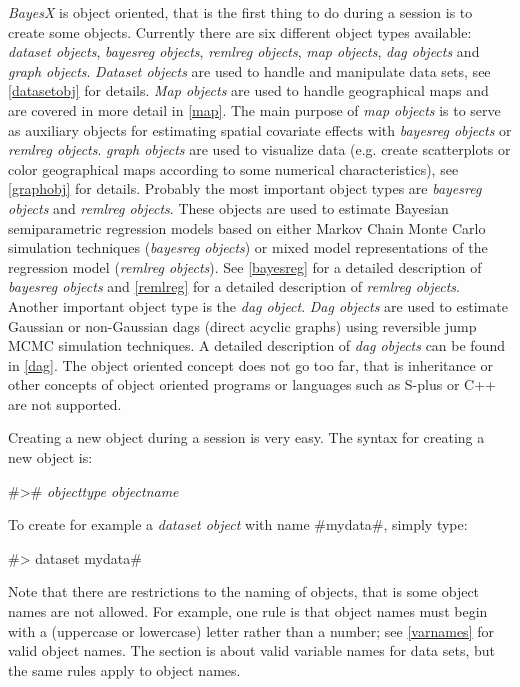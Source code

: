   {\em BayesX} is object
oriented, that is the first thing to do during a session is to
create some objects. Currently there are six different object
types available: {\em dataset objects}, {\em bayesreg objects},
{\em remlreg objects}, {\em map objects}, {\em dag objects} and {\em
graph objects}. {\em Dataset objects} are used to handle and
manipulate data sets, see \autoref{datasetobj} for details. {\em Map
objects} are used to handle geographical maps and are covered in
more detail in \autoref{map}. The main purpose of {\em map objects} is
to serve as auxiliary objects for estimating spatial covariate
effects with {\em bayesreg objects} or {\em remlreg objects}. {\em
graph objects} are used to visualize data (e.g. create
scatterplots or color geographical maps according to some
numerical characteristics), see \autoref{graphobj} for details.
Probably the most important object types are {\em bayesreg
objects} and {\em remlreg objects}. These objects are used to
estimate Bayesian semiparametric regression models based on either
Markov Chain Monte Carlo simulation techniques ({\em bayesreg
objects}) or mixed model representations of the regression model
({\em remlreg objects}). See \autoref{bayesreg} for a detailed
description of {\em bayesreg objects} and \autoref{remlreg} for a
detailed description of {\em remlreg objects}. Another important
object type is the {\em dag object}. {\em Dag objects} are used to
estimate Gaussian or non-Gaussian dags (direct acyclic graphs)
using reversible jump MCMC simulation techniques. A detailed
description of {\em dag objects} can be found in \autoref{dag}.
The object oriented concept does not go too far, that is
inheritance or other concepts of object oriented programs or
languages such as S-plus or C++ are not supported.

Creating a new object during a session is very easy. The syntax for creating a new object is:

#># {\em objecttype objectname}

To create for example a {\em dataset object} with name #mydata#, simply type:

#> dataset mydata#

Note that there are restrictions to the naming of objects, that is
some object names are not allowed. For example, one rule is that
object names must begin with a (uppercase or lowercase) letter
rather than a number; see \autoref{varnames} for valid object
names. The section is about valid variable names for data sets,
but the same rules apply to object names.

